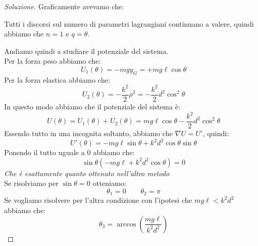 \documentclass[11pt,a4paper,twoside]{article}
\theoremstyle{definition}
\newenvironment{sol}
	{\renewcommand\qedsymbol{$\blacksquare$}\begin{proof}[Soluzione]}
	{\end{proof}}
\begin{document}
\begin{sol}
	Graficamente avevamo che:
	\begin{center}
	\end{center}
	Tutti i discorsi sul numero di parametri lagrangiani continuano a valere, quindi abbiamo che $n = 1$ e $q = \theta$.

	Andiamo quindi a studiare il potenziale del sistema.\\
	Per la forza peso abbiamo che:
	\[ U_1(\theta) = -mgy_G = +mg\ell\cos \theta \]
	Per la forza elastica abbiamo che:
	\[ U_2(\theta) = -\frac{k^2}2 \rho^2 = -\frac{k^2}2 d^2 \cos^2 \theta \]
	In questo modo abbiamo che il potenziale del sistema è:
	\[ U(\theta)= U_1(\theta) + U_2(\theta) = mg\ell \cos \theta - \frac{k^2}{2}d^2 \cos^2 \theta \]
	Essendo tutto in una incognita soltanto, abbiamo che $\nabla U = U'$, quindi:
	\[ U'(\theta) = -mg\ell \sin \theta + k^2 d^2\cos \theta \sin \theta \]
	Ponendo il tutto uguale a $0$ abbiamo che:
	\[ \sin\theta (-mg\ell + k^2d^2 \cos \theta) = 0 \]
	\textit{Che è esattamente quanto ottenuto nell'altro metodo}\\
	Se risolviamo per $\sin\theta = 0$ otteniamo:
	\[ \theta_1 = 0\qquad \theta_2 = \pi \]
	Se vogliamo risolvere per l'altra condizione con l'ipotesi che $mg\ell < k^2d^2$ abbiamo che:
	\[ \theta_3 = \arccos \left( \frac{mg\ell}{k^2d^2} \right) \]


\end{sol}
\end{document}
